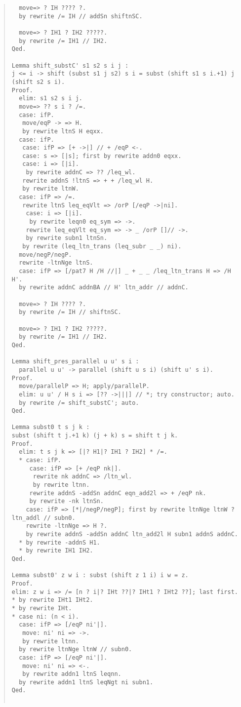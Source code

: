 \documentclass[12pt, titlepage]{ltjsarticle}
\begin{document}
\begin{quote}
\begin{verbatim}
  move=> ? IH ???? ?.
  by rewrite /= IH // addSn shiftnSC.
   
  move=> ? IH1 ? IH2 ?????.
  by rewrite /= IH1 // IH2.
Qed.

Lemma shift_substC' s1 s2 s i j :
j <= i -> shift (subst s1 j s2) s i = subst (shift s1 s i.+1) j (shift s2 s i).
Proof.
  elim: s1 s2 s i j.
  move=> ?? s i ? /=.
  case: ifP.
   move/eqP -> => H.
   by rewrite ltnS H eqxx.
  case: ifP.
   case: ifP => [+ ->|] // + /eqP <-.
   case: s => [|s]; first by rewrite addn0 eqxx.
   case: i => [|i].
    by rewrite addnC => ?? /leq_wl.
   rewrite addnS !ltnS => + + /leq_wl H.
   by rewrite ltnW.
  case: ifP => /=.
   rewrite ltnS leq_eqVlt => /orP [/eqP ->|ni].
    case: i => [|i].
     by rewrite leqn0 eq_sym => ->.
    rewrite leq_eqVlt eq_sym => -> _ /orP []// ->.
    by rewrite subn1 ltnSn.
   by rewrite (leq_ltn_trans (leq_subr _ _) ni).
  move/negP/negP.
  rewrite -ltnNge ltnS.
  case: ifP => [/pat7 H /H //|] _ + _ _ /leq_ltn_trans H => /H H'.
  by rewrite addnC addnBA // H' ltn_addr // addnC.
  
  move=> ? IH ???? ?.
  by rewrite /= IH // shiftnSC.
   
  move=> ? IH1 ? IH2 ?????.
  by rewrite /= IH1 // IH2.
Qed.

Lemma shift_pres_parallel u u' s i :
  parallel u u' -> parallel (shift u s i) (shift u' s i).
Proof.
  move/parallelP => H; apply/parallelP.
  elim: u u' / H s i => [?? ->|||] // *; try constructor; auto.
  by rewrite /= shift_substC'; auto.
Qed.

Lemma subst0 t s j k :
subst (shift t j.+1 k) (j + k) s = shift t j k.
Proof.
  elim: t s j k => [|? H1|? IH1 ? IH2] * /=.
  * case: ifP.
     case: ifP => [+ /eqP nk|].
      rewrite nk addnC => /ltn_wl.
      by rewrite ltnn.
     rewrite addnS -addSn addnC eqn_add2l => + /eqP nk.
     by rewrite -nk ltnSn.
    case: ifP => [*|/negP/negP]; first by rewrite ltnNge ltnW ?ltn_addl // subn0.
    rewrite -ltnNge => H ?.
    by rewrite addnS -addSn addnC ltn_add2l H subn1 addnS addnC.
  * by rewrite -addnS H1.
  * by rewrite IH1 IH2.
Qed.

Lemma subst0' z w i : subst (shift z 1 i) i w = z.
Proof.
elim: z w i => /= [n ? i|? IHt ??|? IHt1 ? IHt2 ??]; last first.
* by rewrite IHt1 IHt2.
* by rewrite IHt.
* case ni: (n < i).
  case: ifP => [/eqP ni'|].
   move: ni' ni => ->.
   by rewrite ltnn.
  by rewrite ltnNge ltnW // subn0.
  case: ifP => [/eqP ni'|].
   move: ni' ni => <-.
   by rewrite addn1 ltnS leqnn.
  by rewrite addn1 ltnS leqNgt ni subn1.
Qed.


\end{verbatim}
\end{quote}
\end{document}

